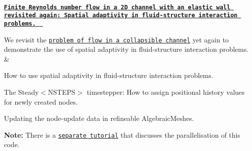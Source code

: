 \begin{longtabu}
\\
\href{../../interaction/fsi_collapsible_channel_adapt/html/index.html}{\tt {\bfseries Finite Reynolds number flow in a 2D channel with an elastic wall revisited again\+: Spatial adaptivity in fluid-\/structure interaction problems. } }

We revisit the \href{../../interaction/fsi_collapsible_channel/html/index.html}{\tt problem of flow in a collapsible channel} yet again to demonstrate the use of spatial adaptivity in fluid-\/structure interaction problems.  &
\begin{DoxyItemize}
\item How to use spatial adaptivity in fluid-\/structure interaction problems.
\item The {\ttfamily Steady$<$\+N\+S\+T\+E\+P\+S$>$} timestepper\+: How to assign positional history values for newly created nodes.
\item Updating the node-\/update data in refineable {\ttfamily Algebraic\+Meshes}.
\end{DoxyItemize}
\begin{DoxyItemize}
\item {\bfseries Note\+:} There is a \href{../../mpi/fsi_channel_with_leaflet/html/index.html}{\tt separate tutorial} that discusses the parallelisation of this code. 
\end{DoxyItemize}



\\
\end{longtabu}
\tabulinesep=1mm

